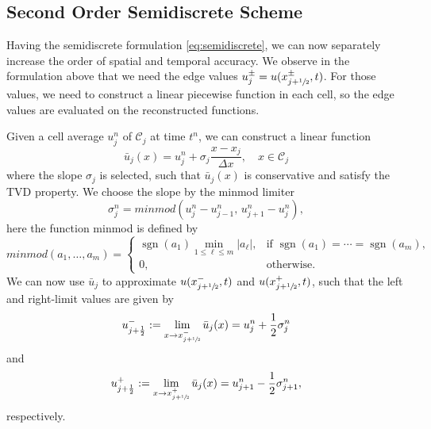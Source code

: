 \subsection{Second Order Semidiscrete Scheme}
Having the semidiscrete formulation \eqref{eq:semidiscrete}, we can now separately increase
the order of spatial and temporal accuracy. We observe in the formulation above that we need the edge values $u_j^{\pm} = u(x_{j +\sfrac{1}{2}}^\pm,t)$. For those values, we need to construct a linear piecewise function in each cell, so the edge values are evaluated on the reconstructed functions.

Given a cell average $u_j^{n}$ of $\mathcal{C}_j$ at time $t^n$, we can construct a linear function
\[
    \bar{u}_j(x)= u_j^{n} + \sigma_j \frac{x-x_j}{\Delta x}, \quad x \in \mathcal{C}_j
\]
where the slope $\sigma_j$ is selected, such that $\bar{u}_j(x)$ is conservative and satisfy the TVD property. We choose the slope by the minmod limiter
\[
    \sigma_j^n
    =
    minmod\!\left(
    u_j^n-u_{j-1}^n,\, u_{j+1}^n-u_j^n \right),
\]
here the function minmod is defined by
\[
    minmod(a_1,\dots,a_m)
    =
    \begin{cases}
        \operatorname{sgn}(a_1)\min_{1\leq \ell\leq m}|a_\ell|,
           & \text{if } \operatorname{sgn}(a_1)=\cdots=\operatorname{sgn}(a_m), \\[1mm]
        0, & \text{otherwise}.
    \end{cases}
\]
We can now use $\bar{u}_j$ to approximate $u(x_{j+\sfrac12}^{-},t)$ and $u(x_{j+\sfrac12}^{+},t)$, such that the left and right-limit values are given by
\begin{align*}
    u_{j+\frac12}^-  := \lim_{x\rightarrow x_{j+\sfrac12}^{-}} \bar{u}_j(x)  =u_j^n+\frac12\sigma_j^n
\end{align*}
and
\begin{align*}
    u_{j+\frac12}^+ := \lim_{x\rightarrow x_{j+\sfrac12}^{+}} \bar{u}_j(x) = u_{j+1}^n-\frac12\sigma_{j+1}^n,
\end{align*}
respectively.

